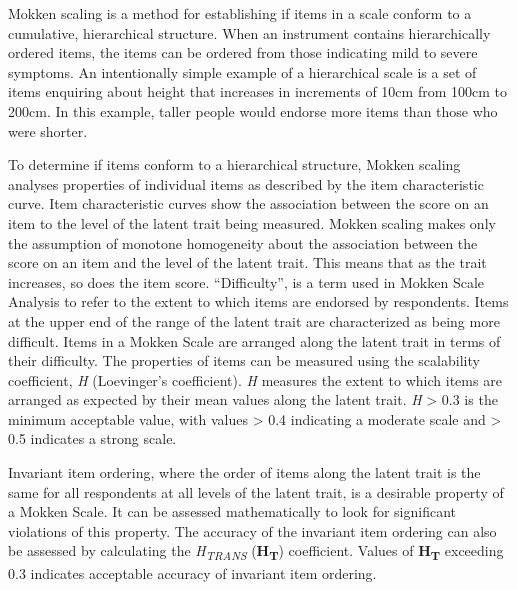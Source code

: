 \documentclass[letterpaper,9pt,twocolumn,twoside,]{pinp}
\begin{document}
Mokken scaling is a method for establishing if items in a scale conform
to a cumulative, hierarchical structure.\citep{perng2012construct} When
an instrument contains hierarchically ordered items, the items can be
ordered from those indicating mild to severe symptoms. An intentionally
simple example of a hierarchical scale is a set of items enquiring about
height that increases in increments of 10cm from 100cm to 200cm. In this
example, taller people would endorse more items than those who were
shorter.\citep{watson2008hierarchy}

To determine if items conform to a hierarchical structure, Mokken
scaling analyses properties of individual items as described by the item
characteristic curve. Item characteristic curves show the association
between the score on an item to the level of the latent trait being
measured. Mokken scaling makes only the assumption of monotone
homogeneity about the association between the score on an item and the
level of the latent trait. This means that as the trait increases, so
does the item score. ``Difficulty'', is a term used in Mokken Scale
Analysis to refer to the extent to which items are endorsed by
respondents. Items at the upper end of the range of the latent trait are
characterized as being more difficult. Items in a Mokken Scale are
arranged along the latent trait in terms of their difficulty. The
properties of items can be measured using the scalability coefficient,
\emph{H} (Loevinger's coefficient). \emph{H} measures the extent to
which items are arranged as expected by their mean values along the
latent trait. \emph{H} \textgreater{} 0.3 is the minimum acceptable
value, with values \textgreater{} 0.4 indicating a moderate scale and
\textgreater{} 0.5 indicates a strong scale.

Invariant item ordering, where the order of items along the latent trait
is the same for all respondents at all levels of the latent trait, is a
desirable property of a Mokken Scale. It can be assessed mathematically
to look for significant violations of this property. The accuracy of the
invariant item ordering can also be assessed by calculating the
\emph{H\textsubscript{TRANS}} (\textbf{H\textsubscript{T}}) coefficient.
Values of \textbf{H\textsubscript{T}} exceeding 0.3 indicates acceptable
accuracy of invariant item ordering.
\end{document}
